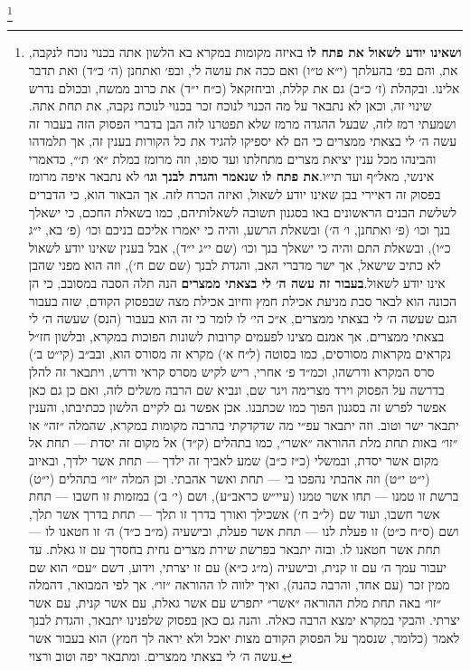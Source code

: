 \documentclass[12pt, openany]{book}
\newcommand{\footnotecomment}[1]{
	\renewcommand\thefootnote{}
	\footnote{\textsf{#1}}}
\newcommand{\commenta}[1]{\footnotecomment{#1}\hspace{0em}}
\begin{document}
\commenta{\textrm{\textbf{ושאינו יודע לשאול את פתח לו}} באיזה מקומות במקרא בא הלשון אתה בכנוי נוכח לנקבה, את, והם בפ׳ בהעלתך (י״א ט״ו) ואם ככה את עושה לי, ובפ׳ ואתחנן (ה׳ כ״ד) ואת תדבר אלינו. ובקהלת (ז׳ כ״ב) גם את קללת, וביחזקאל (כ״ח י״ד) את כרוב ממשח, ובכולם נדרש שינוי זה, וכאן לא נתבאר על מה הכנוי לנוכח זכר בכנוי לנוכח נקבה, את תחת אתה. ושמעתי רמז לזה, שבעל ההגדה מרמז שלא תפטרנו לזה הבן בדברי הפסוק הזה בעבור זה עשה ה׳ לי בצאתי ממצרים כי הם לא יספיקו להגיד את כל הקורות בענין זה, אך תלמדהו והבינהו מכל ענין יציאת מצרים מתחלתו ועד סופו, וזה מרומז במלת ״א׳ ת׳״, כדאמרי אינשי, מאל״ף ועד תי״ו.\textrm{\textbf{את פתח לו שנאמר והגדת לבנך וגו׳}} לא נתבאר איפה מרומז בפסוק זה דאיירי בבן שאינו יודע לשאול, ואיזה הכרח לזה. אך הבאור הוא, כי הדברים לשלשת הבנים הראשונים באו בסגנון תשובה  לשאלותיהם, כמו בשאלת החכם, כי ישאלך בנך וכו׳ (פ׳ ואתחנן, ו׳ ה׳) ובשאלת הרשע, והיה כי יאמרו אליכם בניכם וכו׳ (פ׳ בא, י״ג כ״ו), ובשאלת התם והיה כי ישאלך בנך וכו׳ (שם י״ג י״ד), אבל בענין שאינו יודע לשאול לא כתיב שישאל, אך ישר מדברי האב, והגדת לבנך (שם שם ח׳), וזה הוא מפני שהבן אינו יודע לשאול.\textrm{\textbf{בעבור זה עשה ה׳ לי בצאתי ממצרים}} הנה תלה הסבה במסובב, כי הן הכונה הוא לבאר סבת מניעת אכילת חמץ וחיוב אכילת מצה שבפסוק הקודם, שזה בעבור הגם שעשה ה׳ לי בצאתי ממצרים, א״כ הי׳ לו לומר כי זה הוא בעבור (הנס) שעשה ה׳ לי בצאתי ממצרים. אך אמנם מצינו לפעמים קרובות לשונות הפוכות במקרא, ובלשון חז״ל נקראים מקראות מסורסים, כמו בסוטה (ל״ח א׳) מקרא זה מסורס הוא, ובב״ב (קי״ט ב׳) סרס המקרא ודרשהו, וכמ״ד פ׳ אחרי, ריש לקיש מסרס קראי ודרש, ויתבאר זה להלן בדרשה על הפסוק וירד מצרימה ויגר שם, ונביא שם הרבה משלים לזה, ואם כן גם כאן אפשר לפרש זה בסגנון הפוך כמו שכתבנו. אכן אפשר גם לקיים הלשון ככתיבתו, והענין יתבאר ישר וטוב. וזה יתבאר עפ״י מה שדקדקתי בהרבה מקומות במקרא, שהמלה ״זה״ או ״זו״ באות תחת מלת ההוראה ״אשר״, כמו בתהלים (ק״ד) אל מקום זה יסדת — תחת אל מקום אשר יסדת, ובמשלי (כ״ז כ״ב) שמע לאביך זה ילדך — תחת אשר ילדך, ובאיוב (י״ט י״ט) וזה אהבתי נהפכו בי — תחת ואשר אהבתי. וכן המלה ״זו״ בתהלים (י״ט) ברשת זו טמנו — תחו אשר טמנו (עיי״ש כראב״ע), ושם (י׳ ב׳) במזמות זו חשבו — תחת אשר חשבו, ועוד שם (ל״ב ח׳) אשכילך ואורך בדרך זו תלך — תחת בדרך אשר תלך, ושם (ס״ח כ״ט) זו פעלת לנו — תחת אשר פעלת, ובישעיה (מ״ב כ״ד) ה׳ זו חטאנו לו — תחת אשר חטאנו לו. ובזה יתבאר בפרשת שירת מצרים נחית בחסדך עם זו גאלת. עד יעבור עמך ה׳ עם זו קנית, ובישעיה (מ״ג כ״א) עם זו יצרתי, וידוע, דשם ״עם״ הוא שם ממין זכר (עם אחד, והרבה כהנה), ואיך ילווה לו ההוראה ״זו״. אך לפי המבואר, דהמלה ״זו״ באה תחת מלת ההוראה ״אשר״ יתפרש עם אשר גאלת, עם אשר קנית, עם אשר יצרתי. והבקי במקרא ימצא הרבה כאלה. והנה גם כאן בפסוק שלפנינו יתבאר, והגדת לבנך לאמר (כלומר, שנסמך על הפסוק הקודם מצות יאכל ולא יראה לך חמץ) הוא בעבור אשר עשה ה׳ לי בצאתי ממצרים. ומתבאר יפה וטוב ורצוי.}%
\end{document}
